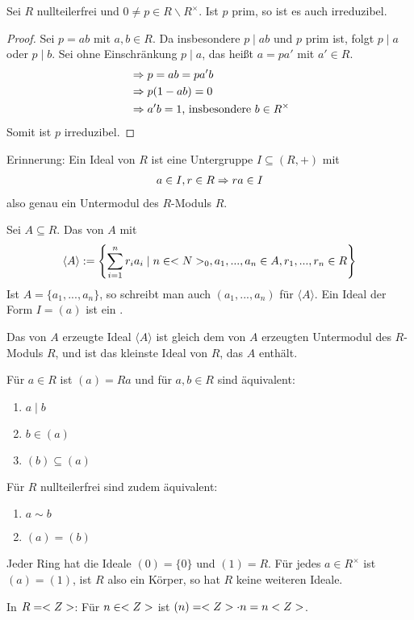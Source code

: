 \begin{proposition}
	Sei $R$ nullteilerfrei und $0\neq p\in R\backslash R^\times$. Ist $p$ prim, so ist es auch irreduzibel.
\end{proposition}
\begin{proof}
	Sei $p=ab$ mit $a,b\in R$. Da insbesondere $p\mid ab$ und $p$ prim ist, folgt $p\mid a$ oder $p\mid b$. Sei ohne Einschränkung $p\mid a$, das heißt $a=pa'$ mit $a'\in R$.
	\begin{align}
		&\Rightarrow p=ab = pa'b\notag \\
		&\Rightarrow p(1-ab) = 0\notag \\
		&\Rightarrow a'b=1\text{, insbesondere }b\in R^\times\notag
	\end{align}
	Somit ist $p$ irreduzibel.
\end{proof}

\begin{remark}
	Erinnerung: Ein Ideal von $R$ ist eine Untergruppe $I\subseteq (R,+)$ mit 
	\begin{align}
		a\in I,r\in R\Rightarrow ra\in I\notag
	\end{align}
	also genau ein Untermodul des $R$-Moduls $R$.
\end{remark}

\begin{definition}
	Sei $A\subseteq R$. Das von $A$  mit
	\begin{align}
		\langle A\rangle :=\left\lbrace \sum_{i=1}^n r_ia_i\mid n\in <N>_0,a_1,...,a_n\in A,r_1,...,r_n\in R\right\rbrace \notag
	\end{align}
	Ist $A=\{a_1,...,a_n\}$, so schreibt man auch $(a_1,...,a_n)$ für $\langle A\rangle$. Ein Ideal der Form $I=(a)$ ist ein .
\end{definition}

\begin{remark}
	Das von $A$ erzeugte Ideal $\langle A\rangle$ ist gleich dem von $A$ erzeugten Untermodul des $R$-Moduls $R$, und ist das kleinste Ideal von $R$, das $A$ enthält.
\end{remark}

\begin{remark}
	Für $a\in R$ ist $(a)=Ra$ und für $a,b\in R$ sind äquivalent:
	\begin{enumerate}
		\item $a\mid b$
		\item $b\in (a)$
		\item $(b)\subseteq (a)$
	\end{enumerate}
	Für $R$ nullteilerfrei sind zudem äquivalent:
	\begin{enumerate}
		\item $a\sim b$
		\item $(a)=(b)$
	\end{enumerate}
\end{remark}

\begin{example}
	Jeder Ring hat die Ideale $(0)=\{0\}$ und $(1)=R$. Für jedes $a\in R^\times$ ist $(a)=(1)$, ist $R$ also ein Körper, so hat $R$ keine weiteren Ideale.
\end{example}

\begin{example}
	In $R=<Z>$: Für $n\in<Z>$ ist $(n)=<Z>\cdot n=n<Z>$.
\end{example}

